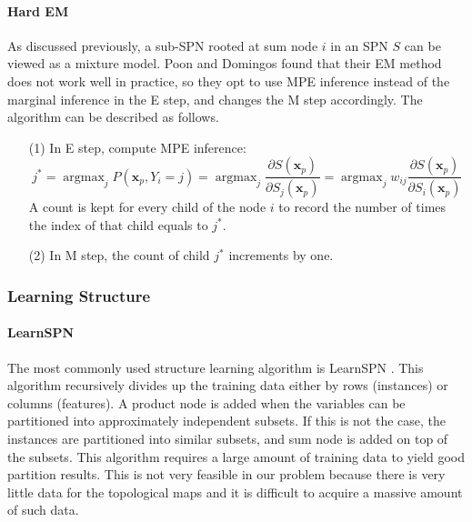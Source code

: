 \documentclass[10pt, titlepage]{article}
\theoremstyle{definition}
\newcommand\mb{\mathbf}
\DeclareMathOperator*{\argmax}{argmax}
\begin{document}
\paragraph{Hard EM} As discussed previously, a sub-SPN rooted at sum node $i$ in an SPN $S$ can be viewed as a mixture model. 
Poon and Domingos found that their EM method does not work well in practice, so they opt to use MPE inference instead of the marginal inference in the E step, and changes the M step accordingly. The algorithm can be described as follows.

\begin{enumerate}
    \item[(1)] In E step, compute MPE inference:
        \begin{equation}
        j^*=\argmax_j P(\mb{x}_p, Y_i=j)=\argmax_j\frac{\partial S(\mb{x}_p)}{\partial S_j(\mb{x}_p)}=\argmax_j w_{ij}\frac{\partial S(\mb{x}_p)}{\partial S_i(\mb{x}_p)}
        \end{equation}
        A count is kept for every child of the node $i$ to record the number of times the index of that child equals to $j^*$.
        
    \item[(2)] In M step, the count of child $j^*$ increments by one.
\end{enumerate}

\subsubsection{Learning Structure}

\paragraph{LearnSPN}
The most commonly used structure learning algorithm is LearnSPN \cite{gens2013learning}. This algorithm recursively divides up the training data either by rows (instances) or columns (features). A product node is added when the variables can be partitioned into approximately independent subsets. If this is not the case, the instances are partitioned into similar subsets, and sum node is added on top of the subsets. This algorithm requires a large amount of training data to yield good partition results. This is not very feasible in our problem because there is very little data for the topological maps and it is difficult to acquire a massive amount of such data.
\end{document}
